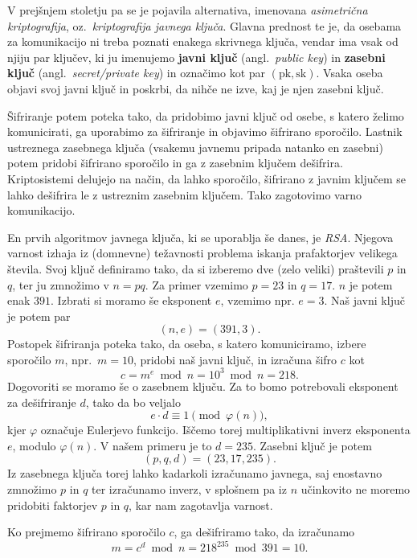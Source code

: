 V prejšnjem stoletju pa se je pojavila alternativa, imenovana \textit{asimetrična kriptografija}, oz.\
\textit{kriptografija javnega ključa}. Glavna prednost te je, da osebama za komunikacijo ni treba
poznati enakega skrivnega ključa, vendar ima vsak od njiju par ključev, ki ju imenujemo \textbf{javni
ključ} (angl.\ \textit{public key}) in \textbf{zasebni ključ} (angl.\ \textit{secret/private key}) in
označimo kot par $(\text{pk}, \text{sk})$. Vsaka oseba objavi svoj javni ključ in poskrbi, da nihče 
ne izve, kaj je njen zasebni ključ.

Šifriranje potem poteka tako, da pridobimo javni ključ od osebe, s katero želimo komunicirati, ga
uporabimo za šifriranje in objavimo šifrirano sporočilo. Lastnik ustreznega zasebnega ključa (vsakemu
javnemu pripada natanko en zasebni) potem pridobi šifrirano sporočilo in ga z zasebnim ključem
dešifrira. Kriptosistemi delujejo na način, da lahko sporočilo, šifrirano z javnim ključem se lahko
dešifrira le z ustreznim zasebnim ključem. Tako zagotovimo varno komunikacijo.

\begin{primer}[RSA]
\label{primer:rsa}
    En prvih algoritmov javnega ključa, ki se uporablja še danes, je \textit{RSA}. Njegova varnost izhaja 
    iz (domnevne) težavnosti problema iskanja prafaktorjev velikega števila. Svoj ključ definiramo tako, 
    da si izberemo dve (zelo veliki) praštevili $p$ in $q$, ter ju zmnožimo v $n = pq$. Za primer vzemimo 
    $p = 23$ in  $q = 17$. $n$ je potem enak $391$. Izbrati si moramo še eksponent $e$, vzemimo npr. $e = 3$. 
    Naš javni ključ je potem par 
    $$ 
    (n, e) = (391, 3).
    $$
    Postopek šifriranja poteka tako, da oseba, s katero komuniciramo, izbere sporočilo $m$, npr.\ 
    $m = 10$, pridobi naš javni ključ, in izračuna šifro $c$ kot
    $$
    c = m^e \bmod{n} = 10^3 \bmod{n} = 218.
    $$
    Dogovoriti se moramo še o zasebnem ključu. Za to bomo potrebovali eksponent za dešifriranje $d$,
    tako da bo veljalo 
    $$
    e \cdot d \equiv 1 \pmod{\varphi(n)},
    $$ 
    kjer $\varphi$ označuje Eulerjevo funkcijo. Iščemo torej multiplikativni inverz eksponenta 
    $e$, modulo $\varphi(n)$. V našem primeru je to $d = 235$. Zasebni ključ je potem 
    $$ 
    (p, q, d) = (23, 17, 235). 
    $$
    Iz zasebnega ključa torej lahko kadarkoli izračunamo javnega, saj enostavno zmnožimo $p$ in $q$ 
    ter izračunamo inverz, v splošnem pa iz $n$ učinkovito ne moremo pridobiti faktorjev $p$ in $q$,
    kar nam zagotavlja varnost.

    Ko prejmemo šifrirano sporočilo $c$, ga dešifriramo tako, da izračunamo
    $$
    m = c^d \bmod{n} = 218^{235} \bmod{391} = 10.
    $$
\end{primer}

